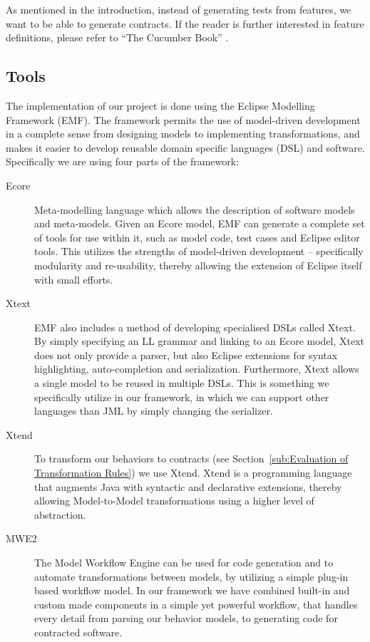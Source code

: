 As mentioned in the introduction, instead of generating tests from features, we want to be able to generate contracts. 
If the reader is further interested in feature definitions, please refer to “The Cucumber Book” \cite{hellesoy2012}.


\subsection{Tools}
The implementation of our project is done using the Eclipse Modelling Framework (EMF).
The framework permits the use of model-driven development in a complete sense from designing models to implementing transformations, and makes
it easier to develop reusable domain specific languages (DSL) and software. Specifically we are using four parts of the framework:
\begin{description}
\item[Ecore] Meta-modelling language which allows the description of software models and meta-models. Given an Ecore model, EMF can
  generate a complete set of tools for use within it, such as model code, test cases and Eclipse editor tools. This utilizes the strengths
  of model-driven development -- specifically modularity and re-usability, thereby allowing the extension of Eclipse itself with small efforts.
\item[Xtext] EMF also includes a method of developing specialised DSLs called Xtext. By simply specifying an LL grammar and linking to an Ecore model,
  Xtext does not only provide a parser, but also Eclipse extensions for syntax highlighting, auto-completion and serialization.
  Furthermore, Xtext allows a single model to be reused in multiple DSLs. This is something we specifically utilize in our framework,
  in which we can support other languages than JML by simply changing the serializer.
\item[Xtend] To transform our behaviors to contracts (see Section~\ref{sub:Evaluation of Transformation Rules}) we use Xtend.
  Xtend is a programming language that augments Java with syntactic and declarative extensions, thereby allowing Model-to-Model transformations using a higher level of abstraction.
\item[MWE2] The Model Workflow Engine can be used for code generation and to automate transformations between models, by utilizing a simple plug-in based
  workflow model. In our framework we have combined built-in and custom made components in a simple yet powerful workflow, that handles every detail
  from parsing our behavior models, to generating code for contracted software.
\end{description}
